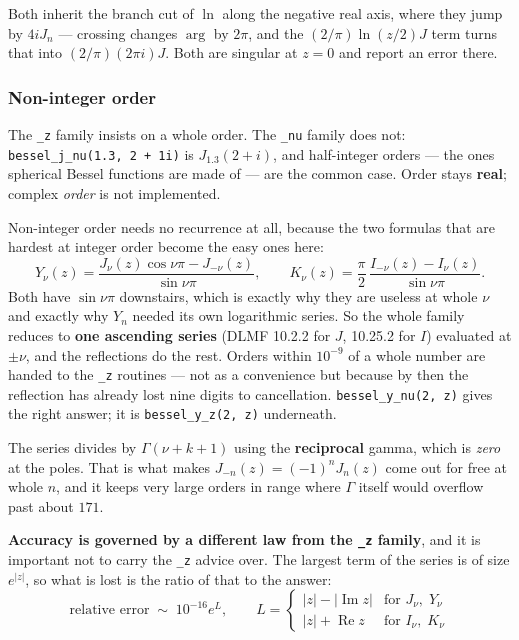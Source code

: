 \documentclass[11pt]{article}
\newcommand{\code}[1]{\texttt{#1}}
\begin{document}
Both inherit the branch cut of $\ln$ along the negative real axis, where
they jump by $4iJ_n$ --- crossing changes $\arg$ by $2\pi$, and the
$(2/\pi)\ln(z/2)J$ term turns that into $(2/\pi)(2\pi i)J$. Both are
singular at $z=0$ and report an error there.

\subsubsection*{Non-integer order}

The \code{\_z} family insists on a whole order. The \code{\_nu} family
does not: \code{bessel\_j\_nu(1.3, 2 + 1i)} is $J_{1.3}(2+i)$, and
half-integer orders --- the ones spherical Bessel functions are made of
--- are the common case. Order stays \textbf{real}; complex \emph{order}
is not implemented.

Non-integer order needs no recurrence at all, because the two formulas
that are hardest at integer order become the easy ones here:
\[
  Y_\nu(z) = \frac{J_\nu(z)\cos\nu\pi - J_{-\nu}(z)}{\sin\nu\pi},
  \qquad
  K_\nu(z) = \frac{\pi}{2}\,
    \frac{I_{-\nu}(z) - I_\nu(z)}{\sin\nu\pi}.
\]
Both have $\sin\nu\pi$ downstairs, which is exactly why they are useless
at whole $\nu$ and exactly why $Y_n$ needed its own logarithmic series.
So the whole family reduces to \textbf{one ascending series} (DLMF
10.2.2 for $J$, 10.25.2 for $I$) evaluated at $\pm\nu$, and the
reflections do the rest. Orders within $10^{-9}$ of a whole number are
handed to the \code{\_z} routines --- not as a convenience but because
by then the reflection has already lost nine digits to cancellation.
\code{bessel\_y\_nu(2, z)} gives the right answer; it is
\code{bessel\_y\_z(2, z)} underneath.

The series divides by $\Gamma(\nu+k+1)$ using the \textbf{reciprocal}
gamma, which is \emph{zero} at the poles. That is what makes
$J_{-n}(z) = (-1)^nJ_n(z)$ come out for free at whole $n$, and it keeps
very large orders in range where $\Gamma$ itself would overflow past
about $171$.

\textbf{Accuracy is governed by a different law from the \code{\_z}
family}, and it is important not to carry the \code{\_z} advice over.
The largest term of the series is of size $e^{|z|}$, so what is lost is
the ratio of that to the answer:
\[
  \text{relative error} \;\sim\; 10^{-16}e^{L},\qquad
  L = \begin{cases}
    |z| - |\operatorname{Im}z| & \text{for } J_\nu,\; Y_\nu\\
    |z| + \operatorname{Re}z   & \text{for } I_\nu,\; K_\nu
  \end{cases}
\]
\end{document}
